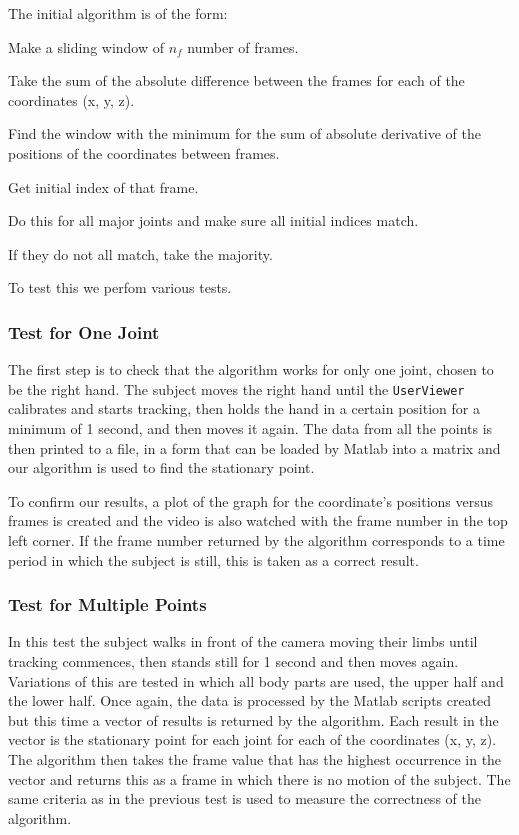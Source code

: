 \documentclass[10pt,a4paper]{article}
\begin{document}
\noindent
The initial algorithm is of the form:
\begin{compactitem}
\setlength{\itemsep}{1pt}
\setlength{\parskip}{0pt}
\setlength{\parsep}{0pt}
	\item Make a sliding window of $n_{f}$ number of frames.
	\item Take the sum of the absolute difference between the frames for each of the coordinates (x, y, z).
	\item Find the window with the minimum for the sum of absolute derivative of the positions of the coordinates between frames.
	\item Get initial index of that frame.
\item Do this for all major joints and make sure all initial indices match.
\item If they do not all match, take the majority. 
\end{compactitem}
\noindent
To test this we perfom various tests.
\subsubsection{Test for One Joint}
The first step is to check that the algorithm works for only one joint, chosen to be the right hand. The subject moves the right hand until the \texttt{UserViewer} calibrates and starts tracking, then holds the hand in a certain position for a minimum of 1 second, and then moves it again. The data from all the points is then printed to a file, in a form that can be loaded by Matlab into a matrix and our algorithm is used to find the stationary point.  

\noindent
To confirm our results, a plot of the graph for the coordinate's positions versus frames is created and the video is also watched with the frame number in the top left corner. If the frame number returned by the algorithm corresponds to a time period in which the subject is still, this is taken as a correct result. 
\subsubsection{Test for Multiple Points}
\noindent 
In this test the subject walks in front of the camera moving their limbs until tracking commences, then stands still for 1 second and then moves again. Variations of this are tested in which all body parts are used, the upper half and the lower half. Once again, the data is processed by the Matlab scripts created but this time a vector of results is returned by the algorithm. Each result in the vector is the stationary point for each joint for each of the coordinates (x, y, z). The algorithm then takes the frame value that has the highest occurrence in the vector and returns this as a frame in which there is no motion of the subject. The same criteria as in the previous test is used to measure the correctness of the algorithm. 
\end{document}
